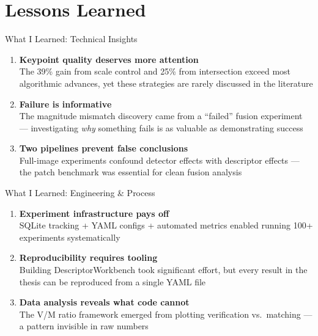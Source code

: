 \documentclass[aspectratio=169, 12pt]{beamer}
\begin{document}
\section{Lessons Learned}

\begin{frame}{What I Learned: Technical Insights}
  \begin{enumerate}
    \item \textbf{Keypoint quality deserves more attention}\\
          {\small The 39\% gain from scale control and 25\% from intersection exceed most algorithmic advances, yet these strategies are rarely discussed in the literature}

    \item \textbf{Failure is informative}\\
          {\small The magnitude mismatch discovery came from a ``failed'' fusion experiment ---
          investigating \textit{why} something fails is as valuable as demonstrating success}

    \item \textbf{Two pipelines prevent false conclusions}\\
          {\small Full-image experiments confound detector effects with descriptor effects ---
          the patch benchmark was essential for clean fusion analysis}
  \end{enumerate}
\end{frame}

\begin{frame}{What I Learned: Engineering \& Process}
  \begin{enumerate}
    \item \textbf{Experiment infrastructure pays off}\\
          {\small SQLite tracking + YAML configs + automated metrics enabled running 100+ experiments systematically}

    \item \textbf{Reproducibility requires tooling}\\
          {\small Building DescriptorWorkbench took significant effort, but every result in the thesis can be reproduced from a single YAML file}

    \item \textbf{Data analysis reveals what code cannot}\\
          {\small The V/M ratio framework emerged from plotting verification vs.\ matching --- a pattern invisible in raw numbers}
  \end{enumerate}
\end{frame}
\end{document}
